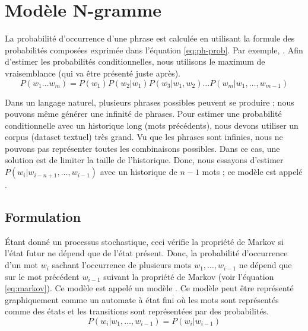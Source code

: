 \documentclass{KodeBook}
\begin{document}
\section{Modèle N-gramme}

La probabilité d'occurrence d'une phrase est calculée en utilisant la formule des probabilités composées exprimée dans l'équation \ref{eq:ph-prob}.
Par exemple, .
Afin d'estimer les probabilités conditionnelles, nous utilisons le maximum de vraisemblance (qui va être présenté juste après).
\begin{equation}\label{eq:ph-prob}
	P(w_1 \ldots w_m) =  P(w_1) P(w_2 | w_1) P(w_3 | w_1, w_2) \ldots P(w_m | w_1, \ldots, w_{m-1})
\end{equation}

Dans un langage naturel, plusieurs phrases possibles peuvent se produire ; nous pouvons même générer une infinité de phrases.
Pour estimer une probabilité conditionnelle avec un historique long (mots précédents), nous devons utiliser un corpus (dataset textuel) très grand. 
Vu que les phrases sont infinies, nous ne pouvons pas représenter toutes les combinaisons possibles. 
Dans ce cas, une solution est de limiter la taille de l'historique. 
Donc, nous essayons d'estimer $P(w_i|w_{i-n+1},\ldots,w_{i-1})$ avec un historique de $n-1$ mots ; 
ce modèle est appelé .

\subsection{Formulation}

Étant donné un processus stochastique, ceci vérifie la propriété de Markov si l'état futur ne dépend que de l'état présent. 
Donc, la probabilité d'occurrence d'un mot $w_i$ sachant l'occurrence de plusieurs mots $w_1, \ldots, w_{i-1}$ ne dépend que sur le mot précédent $w_{i-1}$ suivant la propriété de Markov (voir l'équation \ref{eq:markov}). 
Ce modèle est appelé un modèle .
Ce modèle peut être représenté graphiquement comme un automate à état fini où les mots sont représentés comme des états et les transitions sont représentées par des probabilités.
\begin{equation}
	P(w_i | w_1,\ldots, w_{i-1}) = P(w_i | w_{i-1})
	\label{eq:markov}
\end{equation}
\end{document}

